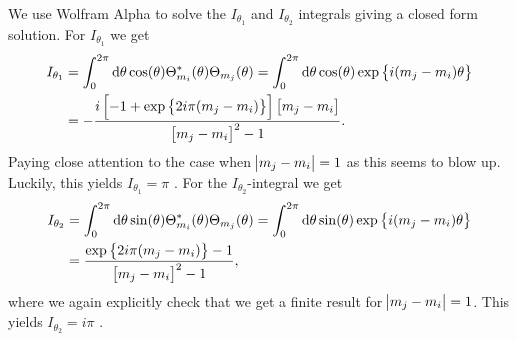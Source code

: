             We use Wolfram Alpha to solve the $I_{\theta_1}$ and $I_{\theta_2}$
            integrals giving a closed form solution. For $I_{\theta_1}$ we get
            \cite{wolframalphai1}
            \begin{align}
                I_{\theta_1}
                &=
                \int_{0}^{2\pi} \mathrm{d} \theta \cos(\theta)
                \Theta_{m_i}^{*}(\theta) \Theta_{m_j}(\theta)
                =
                \int_{0}^{2\pi} \mathrm{d} \theta \cos(\theta)
                \exp\left\{ i(m_j - m_i)\theta \right\}
                \\
                &=
                - \frac{
                    i\left[ 
                        -1 + \exp\left\{ 2i\pi(m_j - m_i) \right\}
                     \right]\left[ m_j - m_i \right]
                }{
                    \left[ m_j - m_i \right]^2 - 1
                }.
            \end{align}
            Paying close attention to the case when $\abs{m_j - m_i} = 1$ as
            this seems to blow up. Luckily, this yields $I_{\theta_1} = \pi$
            \cite{wolframalphai1-zero}. For the $I_{\theta_2}$-integral we get
            \cite{wolframalphai2}
            \begin{align}
                I_{\theta_2}
                &=
                \int_{0}^{2\pi} \mathrm{d} \theta \sin(\theta)
                \Theta_{m_i}^{*}(\theta) \Theta_{m_j}(\theta)
                =
                \int_{0}^{2\pi} \mathrm{d} \theta \sin(\theta)
                \exp\left\{ i(m_j - m_i)\theta \right\}
                \\
                &=
                \frac{\exp\left\{ 2i\pi(m_j - m_i) \right\} - 1}{\left[ m_j - m_i \right]^2 - 1},
            \end{align}
            where we again explicitly check that we get a finite result for
            $\abs{m_j - m_i} = 1$. This yields $I_{\theta_2} = i\pi$
            \cite{wolframalphai2-zero}.

